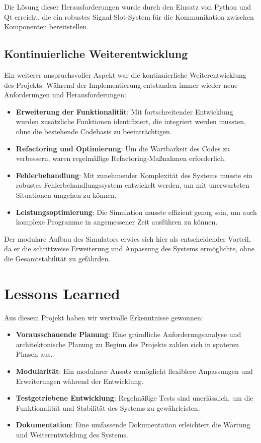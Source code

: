 Die Lösung dieser Herausforderungen wurde durch den Einsatz von Python und Qt erreicht, die ein robustes Signal-Slot-System für die Kommunikation zwischen Komponenten bereitstellen.

\subsection{Kontinuierliche Weiterentwicklung}

Ein weiterer anspruchsvoller Aspekt war die kontinuierliche Weiterentwicklung des Projekts. Während der Implementierung entstanden immer wieder neue Anforderungen und Herausforderungen:

\begin{itemize}
    \item \textbf{Erweiterung der Funktionalität}: Mit fortschreitender Entwicklung wurden zusätzliche Funktionen identifiziert, die integriert werden mussten, ohne die bestehende Codebasis zu beeinträchtigen.
    \item \textbf{Refactoring und Optimierung}: Um die Wartbarkeit des Codes zu verbessern, waren regelmäßige Refactoring-Maßnahmen erforderlich.
    \item \textbf{Fehlerbehandlung}: Mit zunehmender Komplexität des Systems musste ein robustes Fehlerbehandlungssystem entwickelt werden, um mit unerwarteten Situationen umgehen zu können.
    \item \textbf{Leistungsoptimierung}: Die Simulation musste effizient genug sein, um auch komplexe Programme in angemessener Zeit ausführen zu können.
\end{itemize}

Der modulare Aufbau des Simulators erwies sich hier als entscheidender Vorteil, da er die schrittweise Erweiterung und Anpassung des Systems ermöglichte, ohne die Gesamtstabilität zu gefährden.

\section{Lessons Learned}

Aus diesem Projekt haben wir wertvolle Erkenntnisse gewonnen:

\begin{itemize}
    \item \textbf{Vorausschauende Planung}: Eine gründliche Anforderungsanalyse und architektonische Planung zu Beginn des Projekts zahlen sich in späteren Phasen aus.
    \item \textbf{Modularität}: Ein modularer Ansatz ermöglicht flexiblere Anpassungen und Erweiterungen während der Entwicklung.
    \item \textbf{Testgetriebene Entwicklung}: Regelmäßige Tests sind unerlässlich, um die Funktionalität und Stabilität des Systems zu gewährleisten.
    \item \textbf{Dokumentation}: Eine umfassende Dokumentation erleichtert die Wartung und Weiterentwicklung des Systems.
\end{itemize}

